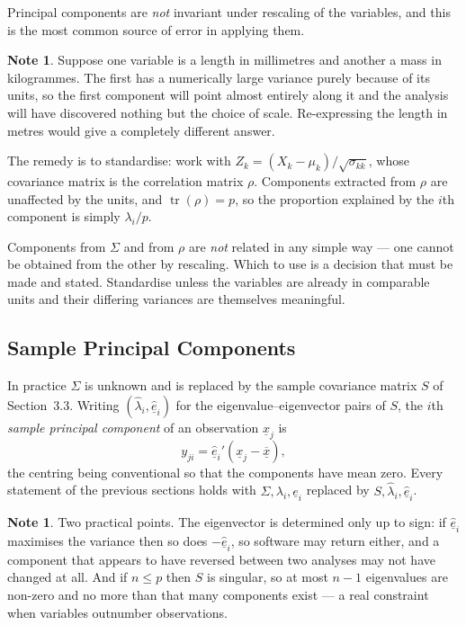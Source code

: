 \documentclass[11pt,a4paper]{article}
\theoremstyle{definition}
\newtheorem{note}[thm]{Note}
\begin{document}
Principal components are \emph{not} invariant under rescaling of the variables,
and this is the most common source of error in applying them.

\begin{note}
Suppose one variable is a length in millimetres and another a mass in
kilogrammes. The first has a numerically large variance purely because of its
units, so the first component will point almost entirely along it and the
analysis will have discovered nothing but the choice of scale. Re-expressing the
length in metres would give a completely different answer.

The remedy is to standardise: work with
$Z_k = \left(X_k-\mu_k\right)/\sqrt{\sigma_{kk}}$, whose covariance matrix is
the correlation matrix $\rho$. Components extracted from $\rho$ are unaffected
by the units, and $\operatorname{tr}(\rho)=p$, so the proportion explained by
the $i$th component is simply $\lambda_i/p$.

Components from $\Sigma$ and from $\rho$ are \emph{not} related in any simple
way --- one cannot be obtained from the other by rescaling. Which to use is a
decision that must be made and stated. Standardise unless the variables are
already in comparable units and their differing variances are themselves
meaningful.
\end{note}

\subsection{Sample Principal Components}

In practice $\Sigma$ is unknown and is replaced by the sample covariance matrix
$S$ of Section~3.3. Writing
$(\widehat{\lambda}_i, \widehat{\underline{e}}_i)$ for the eigenvalue--eigenvector
pairs of $S$, the $i$th \emph{sample principal component} of an observation
$\underline{x}_j$ is
$$y_{ji} = \widehat{\underline{e}}_i'\left(\underline{x}_j-\overline{\underline{x}}\right),$$
the centring being conventional so that the components have mean zero. Every
statement of the previous sections holds with $\Sigma,\lambda_i,\underline{e}_i$
replaced by $S,\widehat{\lambda}_i,\widehat{\underline{e}}_i$.

\begin{note}
Two practical points. The eigenvector is determined only up to sign: if
$\widehat{\underline{e}}_i$ maximises the variance then so does
$-\widehat{\underline{e}}_i$, so software may return either, and a component
that appears to have reversed between two analyses may not have changed at all.
And if $n\leq p$ then $S$ is singular, so at most $n-1$ eigenvalues are
non-zero and no more than that many components exist --- a real constraint when
variables outnumber observations.
\end{note}
\end{document}
